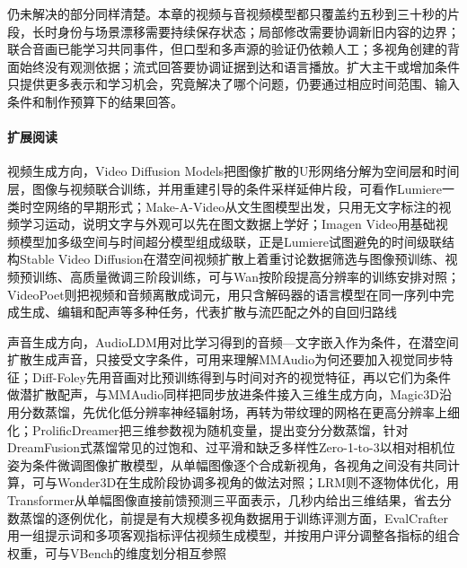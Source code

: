 仍未解决的部分同样清楚。本章的视频与音视频模型都只覆盖约五秒到三十秒的片段，长时身份与场景漂移需要持续保存状态；局部修改需要协调新旧内容的边界；联合音画已能学习共同事件，但口型和多声源的验证仍依赖人工；多视角创建的背面始终没有观测依据；流式回答要协调证据到达和语言播放。扩大主干或增加条件只提供更多表示和学习机会，究竟解决了哪个问题，仍要通过相应时间范围、输入条件和制作预算下的结果回答。

\paragraph{扩展阅读}
视频生成方向，Video Diffusion Models把图像扩散的U形网络分解为空间层和时间层，图像与视频联合训练，并用重建引导的条件采样延伸片段，可看作Lumiere一类时空网络的早期形式；Make-A-Video从文生图模型出发，只用无文字标注的视频学习运动，说明文字与外观可以先在图文数据上学好；Imagen Video用基础视频模型加多级空间与时间超分模型组成级联，正是Lumiere试图避免的时间级联结构Stable Video Diffusion在潜空间视频扩散上着重讨论数据筛选与图像预训练、视频预训练、高质量微调三阶段训练，可与Wan按阶段提高分辨率的训练安排对照；VideoPoet则把视频和音频离散成词元，用只含解码器的语言模型在同一序列中完成生成、编辑和配声等多种任务，代表扩散与流匹配之外的自回归路线

声音生成方向，AudioLDM用对比学习得到的音频—文字嵌入作为条件，在潜空间扩散生成声音，只接受文字条件，可用来理解MMAudio为何还要加入视觉同步特征；Diff-Foley先用音画对比预训练得到与时间对齐的视觉特征，再以它们为条件做潜扩散配声，与MMAudio同样把同步放进条件接入三维生成方向，Magic3D沿用分数蒸馏，先优化低分辨率神经辐射场，再转为带纹理的网格在更高分辨率上细化；ProlificDreamer把三维参数视为随机变量，提出变分分数蒸馏，针对DreamFusion式蒸馏常见的过饱和、过平滑和缺乏多样性Zero-1-to-3以相对相机位姿为条件微调图像扩散模型，从单幅图像逐个合成新视角，各视角之间没有共同计算，可与Wonder3D在生成阶段协调多视角的做法对照；LRM则不逐物体优化，用Transformer从单幅图像直接前馈预测三平面表示，几秒内给出三维结果，省去分数蒸馏的逐例优化，前提是有大规模多视角数据用于训练评测方面，EvalCrafter用一组提示词和多项客观指标评估视频生成模型，并按用户评分调整各指标的组合权重，可与VBench的维度划分相互参照
